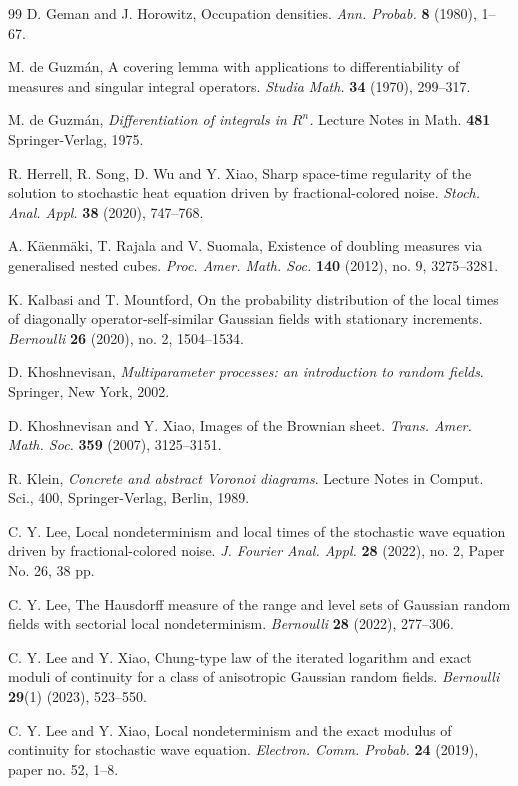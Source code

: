\documentclass[11pt, reqno]{amsart}
\numberwithin{equation}{section}
\begin{document}
\begin{thebibliography}{99}
D. Geman and J. Horowitz, Occupation densities. {\it Ann. Probab.} {\bf 8} (1980), 1--67.

M. de Guzm\'{a}n, A covering lemma with applications to differentiability of measures and singular integral operators. 
{\it Studia Math. } {\bf 34} (1970), 299--317.

M. de Guzm\'{a}n, {\it Differentiation of integrals in $R^n$.} Lecture Notes in Math. {\bf 481} Springer-Verlag, 1975.

R. Herrell, R. Song, D. Wu and Y. Xiao, Sharp space-time regularity of the solution to stochastic heat equation driven 
by fractional-colored noise. {\it Stoch. Anal. Appl.} {\bf 38} (2020), 747--768.


A. K\"{a}enm\"{a}ki, T. Rajala and V. Suomala, Existence of doubling measures via
generalised nested cubes. {\it Proc. Amer. Math. Soc.} {\bf 140} (2012), no. 9, 3275--3281.

K. Kalbasi and T. Mountford, On the probability distribution of the local times of diagonally operator-self-similar 
Gaussian fields with stationary increments. {\it Bernoulli} {\bf 26} (2020), no. 2, 1504--1534. 

D. Khoshnevisan, {\it Multiparameter processes: an introduction to random fields}. Springer, New York, 2002.

D. Khoshnevisan and Y. Xiao, Images of the Brownian sheet.
{\it Trans. Amer. Math. Soc.} {\bf 359} (2007), 3125--3151.

R. Klein, {\it Concrete and abstract Voronoi diagrams}. Lecture Notes in Comput. Sci., 400, Springer-Verlag, Berlin, 1989.

C. Y. Lee, Local nondeterminism and local times of the stochastic wave equation driven by fractional-colored noise.
{\it J. Fourier Anal. Appl.} {\bf 28} (2022), no. 2, Paper No. 26, 38 pp.

C. Y. Lee, The Hausdorff measure of the range and level sets of Gaussian random fields with sectorial local nondeterminism. 
{\it Bernoulli } {\bf 28} (2022),  277--306.

C. Y. Lee and Y. Xiao, Chung-type law of the iterated logarithm and exact moduli of continuity for a class of anisotropic 
 Gaussian random fields.  {\it Bernoulli} {\bf 29}(1) (2023), 523--550.

C. Y. Lee and Y. Xiao,  Local nondeterminism and the exact modulus of
continuity for stochastic wave equation. {\it Electron. Comm. Probab.}  {\bf 24}
(2019), paper no. 52, 1--8.


\end{thebibliography}
\end{document}
